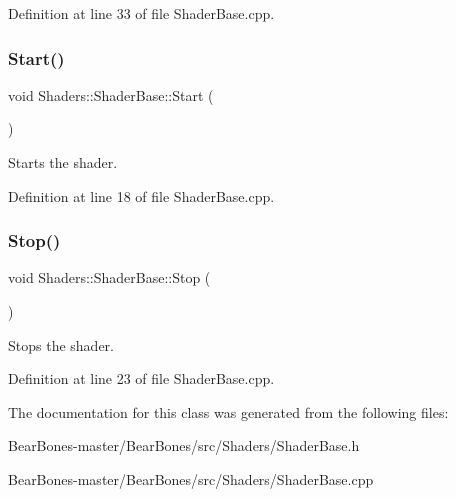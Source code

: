 Definition at line 33 of file Shader\+Base.\+cpp.

\mbox{\label{class_shaders_1_1_shader_base_a70efd0722655ec3dd0c2de014a04fd17}} 
\subsubsection{\texorpdfstring{Start()}{Start()}}
{\footnotesize\ttfamily void Shaders\+::\+Shader\+Base\+::\+Start (\begin{DoxyParamCaption}{ }\end{DoxyParamCaption})}

Starts the shader. 

Definition at line 18 of file Shader\+Base.\+cpp.

\mbox{\label{class_shaders_1_1_shader_base_a1d5f73624ff4f59633b159fd0772e84c}} 
\subsubsection{\texorpdfstring{Stop()}{Stop()}}
{\footnotesize\ttfamily void Shaders\+::\+Shader\+Base\+::\+Stop (\begin{DoxyParamCaption}{ }\end{DoxyParamCaption})}

Stops the shader. 

Definition at line 23 of file Shader\+Base.\+cpp.



The documentation for this class was generated from the following files\+:\begin{DoxyCompactItemize}
\item 
Bear\+Bones-\/master/\+Bear\+Bones/src/\+Shaders/Shader\+Base.\+h\item 
Bear\+Bones-\/master/\+Bear\+Bones/src/\+Shaders/Shader\+Base.\+cpp\end{DoxyCompactItemize}
